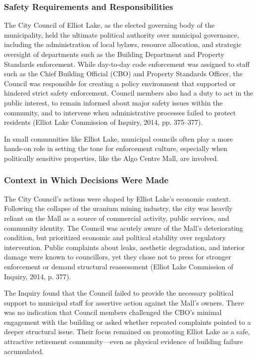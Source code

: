 \documentclass[12pt]{article}
\begin{document}
\subsubsection*{Safety Requirements and Responsibilities}
The City Council of Elliot Lake, as the elected governing body of the municipality, held the ultimate political authority over municipal governance, including the administration of local bylaws, resource allocation, and strategic oversight of departments such as the Building Department and Property Standards enforcement. While day-to-day code enforcement was assigned to staff such as the Chief Building Official (CBO) and Property Standards Officer, the Council was responsible for creating a policy environment that supported or hindered strict safety enforcement. Council members also had a duty to act in the public interest, to remain informed about major safety issues within the community, and to intervene when administrative processes failed to protect residents (Elliot Lake Commission of Inquiry, 2014, pp. 375–377).

In small communities like Elliot Lake, municipal councils often play a more hands-on role in setting the tone for enforcement culture, especially when politically sensitive properties, like the Algo Centre Mall, are involved.

\subsubsection*{Context in Which Decisions Were Made}
The City Council’s actions were shaped by Elliot Lake’s economic context. Following the collapse of the uranium mining industry, the city was heavily reliant on the Mall as a source of commercial activity, public services, and community identity. The Council was acutely aware of the Mall’s deteriorating condition, but prioritized economic and political stability over regulatory intervention. Public complaints about leaks, aesthetic degradation, and interior damage were known to councillors, yet they chose not to press for stronger enforcement or demand structural reassessment (Elliot Lake Commission of Inquiry, 2014, p. 377).

The Inquiry found that the Council failed to provide the necessary political support to municipal staff for assertive action against the Mall’s owners. There was no indication that Council members challenged the CBO’s minimal engagement with the building or asked whether repeated complaints pointed to a deeper structural issue. Their focus remained on promoting Elliot Lake as a safe, attractive retirement community—even as physical evidence of building failure accumulated.
\end{document}
